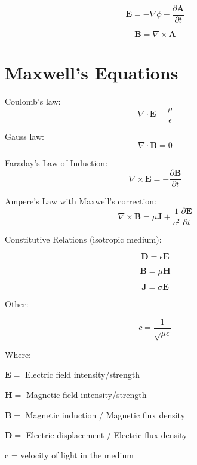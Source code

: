 \documentclass[english]{book}
\begin{document}
\begin{equation}
\mathbf{E}=-\nabla\phi - \frac{\partial\mathbf{A}}{\partial t}              \label{eq:Epot}
\end{equation}

\begin{equation}
\mathbf{B}=\nabla\times\mathbf{A}          \label{eq:Bpot}
\end{equation}


\section{Maxwell's Equations}

Coulomb's law:
\begin{equation}
\nabla\cdot\mathbf{E}=\frac{\rho}{\epsilon}    \label{eq:lawCoulomb}
\end{equation}

Gauss law:
\begin{equation}
\nabla\cdot\mathbf{B}=0        \label{eq:lawGauss}
\end{equation}

Faraday's Law of Induction:
\begin{equation}
\nabla\times\mathbf{E}=-\frac{\partial\mathbf{B}}{\partial t}    \label{eq:lawFaraday}
\end{equation}

Ampere's Law with Maxwell's correction:
\begin{equation}
\nabla\times\mathbf{B}=\mu\mathbf{J}+\frac{1}{c^{2}}\frac{\partial\mathbf{E}}{\partial t}        \label{eq:lawAmpere}
\end{equation}

Constitutive Relations (isotropic medium):

\[ \mathbf{D} = \epsilon \mathbf{E} \]

\[ \mathbf{B} = \mu \mathbf{H} \]

\[ \mathbf{J} = \sigma \mathbf{E} \]

Other:

\[ c = \frac{1}{\sqrt{\mu \epsilon}}\]

Where:

$\mathbf{E} =$ Electric field intensity/strength

$\mathbf{H} =$ Magnetic field intensity/strength

$\mathbf{B} =$ Magnetic induction / Magnetic flux density

$\mathbf{D} =$ Electric displacement / Electric flux density

c = velocity of light in the medium
\end{document}
